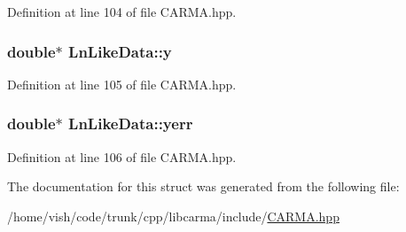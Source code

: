Definition at line 104 of file C\-A\-R\-M\-A.\-hpp.

\hypertarget{struct_ln_like_data_ac75cc1e68fffac23d841e09f927a0a53}{
\subsubsection[{y}]{\setlength{\rightskip}{0pt plus 5cm}double$\ast$ Ln\-Like\-Data\-::y}}\label{struct_ln_like_data_ac75cc1e68fffac23d841e09f927a0a53}


Definition at line 105 of file C\-A\-R\-M\-A.\-hpp.

\hypertarget{struct_ln_like_data_a54330ef049f623a902d04f58e5aee208}{
\subsubsection[{yerr}]{\setlength{\rightskip}{0pt plus 5cm}double$\ast$ Ln\-Like\-Data\-::yerr}}\label{struct_ln_like_data_a54330ef049f623a902d04f58e5aee208}


Definition at line 106 of file C\-A\-R\-M\-A.\-hpp.



The documentation for this struct was generated from the following file\-:\begin{DoxyCompactItemize}
\item 
/home/vish/code/trunk/cpp/libcarma/include/\hyperlink{_c_a_r_m_a_8hpp}{C\-A\-R\-M\-A.\-hpp}\end{DoxyCompactItemize}
